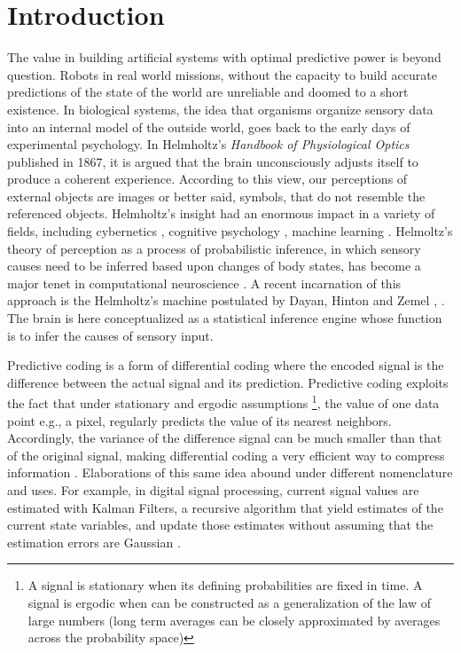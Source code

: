 \documentclass[11pt,twocolumn]{article}
\begin{document}
\section{Introduction}
The value in building artificial systems with optimal predictive power is beyond question. Robots in real world missions, without the capacity to build accurate predictions of the state of the world are unreliable and doomed to a short existence. 
In biological systems, the idea that organisms organize sensory data into an internal model of the outside world, goes back to the early days of experimental psychology. In Helmholtz's \emph{Handbook of Physiological Optics} published in 1867, it is argued that the brain unconsciously adjusts itself to produce a coherent experience. According to this view, our perceptions of external objects are images or better said, symbols, that do not resemble the referenced objects. Helmholtz's insight had an enormous impact in a variety of fields, including cybernetics \citep{ashby_introduction_2015}, cognitive psychology \citep{neisser_cognitive_2014}, machine learning \citep{neal_view_1998}. Helmoltz's theory of perception as a process of probabilistic inference, in which sensory causes need to be inferred based upon changes of body states, has become a major tenet in computational neuroscience \citep{Dayan:2002}. 
A recent incarnation of this approach is the Helmholtz's machine postulated by Dayan, Hinton and Zemel \citep{dayan_helmholtz_1995}, \citep{dayan_varieties_1996}. The brain is here conceptualized as a statistical inference engine whose function is to infer the causes of sensory input. 

Predictive coding is a form of differential coding where the encoded signal is the difference between the actual signal and its prediction. Predictive coding exploits the fact that under stationary and ergodic assumptions \footnote{A signal is stationary when its defining probabilities are fixed in time. A signal is ergodic when can be constructed as a generalization of the law of large numbers (long term averages can be closely approximated by averages across the probability space)}, the value of one data point e.g., a pixel, regularly predicts the value of its nearest neighbors. Accordingly, the variance of the difference signal can be much smaller than that of the original signal, making differential coding a very efficient way to compress information \citep{shi_image_1999}.
Elaborations of this same idea abound under different nomenclature and uses. For example, in digital signal processing, current signal values are estimated with Kalman Filters, a recursive algorithm that yield estimates  of the current state variables, and update those estimates  without assuming that the estimation errors are Gaussian \citep{kalman_new_1960}. 
\end{document}
